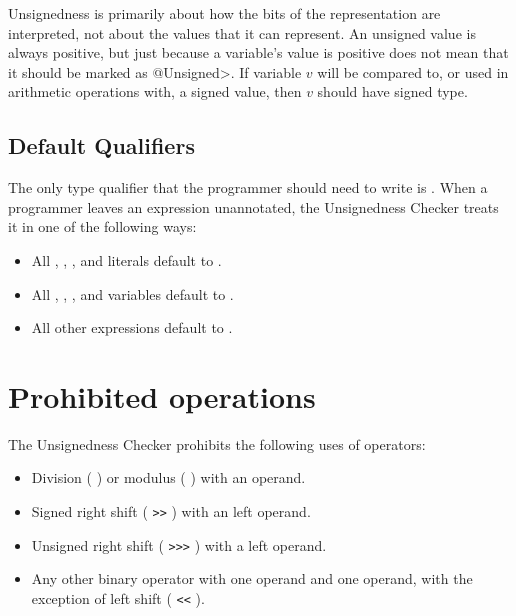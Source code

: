 Unsignedness is primarily about how the bits of the representation are
interpreted, not about the values that it can represent.  An unsigned value
is always positive, but just because a variable's value is positive does
not mean that it should be marked as \<@Unsigned>.  If variable $v$ will be
compared to, or used in arithmetic operations with, a signed value, then
$v$ should have signed type.


\subsection{Default Qualifiers\label{unsignedness-checker-annotations-default-qualifiers}}

The only type qualifier that the programmer should need to write is
. When a programmer leaves an expression unannotated, the
Unsignedness Checker treats it in one of the following ways:

\begin{itemize}

    \item
    All , , , and  literals default
    to .
    \item
    All , , , and  variables default
    to .
    \item
    All other expressions default to .

\end{itemize}

\section{Prohibited operations\label{unsignedness-checker-prohibited-operations}}

The Unsignedness Checker prohibits the following uses of operators:

\begin{itemize}

    \item
    Division ( \code{/} ) or modulus ( \code{\%} ) with an 
    operand.
    \item
    Signed right shift ( \verb|>>| ) with an  left operand.
    \item
    Unsigned right shift ( \verb|>>>| ) with a  left operand.
    \item
    Any other binary operator with one  operand and one
     operand, with the exception of left shift ( \verb|<<| ).

\end{itemize}

